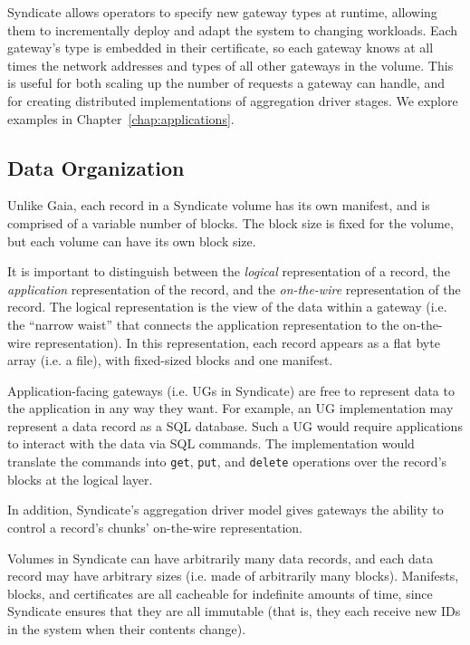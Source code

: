Syndicate allows operators to specify new gateway types at runtime, allowing
them to incrementally deploy and adapt the system to changing workloads.  Each
gateway's type is embedded in their certificate, so each gateway knows at all
times the network addresses and types of all other gateways in the volume.
This is useful for both scaling up the number of requests a gateway can handle,
and for creating distributed implementations of aggregation driver stages.  We
explore examples in Chapter~\ref{chap:applications}.

\subsection{Data Organization}

Unlike Gaia, each record in a Syndicate volume has its own manifest, and is
comprised of a variable number of blocks.  The block size is fixed for the
volume, but each volume can have its own block size.

It is important to distinguish between the \emph{logical} representation of a record,
the \emph{application} representation of the record, and the 
\emph{on-the-wire} representation of the record.  The logical representation is
the view of the data within a gateway (i.e. the ``narrow waist'' that connects
the application representation to the on-the-wire representation).  In this
representation, each record appears as a flat byte array (i.e. a file), with
fixed-sized blocks and one manifest.

Application-facing gateways (i.e. UGs in Syndicate) are free to represent data 
to the application in any way they want.  For example, an UG implementation
may represent a data record as a
SQL database.  Such a UG would require applications to interact with the data
via SQL commands.  The implementation would translate the commands into
\texttt{get}, \texttt{put}, and \texttt{delete} operations over the record's
blocks at the logical layer.

In addition, Syndicate's aggregation driver model gives gateways the ability to
control a record's chunks' on-the-wire representation.  %

Volumes in Syndicate can have arbitrarily many data records, and each data
record may have arbitrary sizes (i.e. made of arbitrarily many blocks).
Manifests, blocks, and certificates are all cacheable for
indefinite amounts of time, since Syndicate ensures that they are all immutable
(that is, they each receive new IDs in the system when their contents change).


